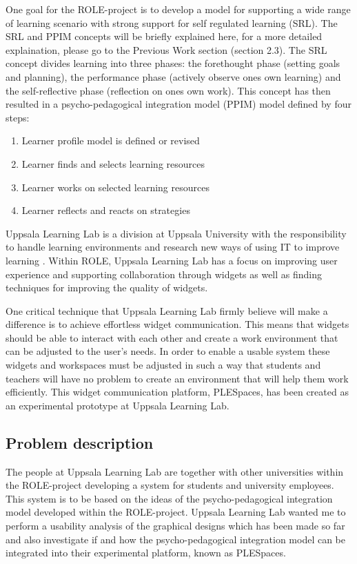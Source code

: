 One goal for the ROLE-project is to develop a model for supporting a wide range of learning scenario with strong support for self regulated learning (SRL). The SRL and PPIM concepts will be briefly explained here, for a more detailed explaination, please go to the Previous Work section (section 2.3). The SRL concept divides learning into three phases: the forethought phase (setting goals and planning), the performance phase (actively observe ones own learning) and the self-reflective phase (reflection on ones own work). This concept has then resulted in a  psycho-pedagogical integration model (PPIM) model defined by four steps: \cite{nussbaumer}
\begin {enumerate}
	\item Learner profile model is defined or revised
	\item Learner finds and selects learning resources
	\item Learner works on selected learning resources
	\item Learner reflects and reacts on strategies
\end {enumerate}

Uppsala Learning Lab is a division at Uppsala University with the responsibility to handle learning environments and research new ways of using IT to improve learning \cite{ull}. Within ROLE, Uppsala Learning Lab has a focus on improving user experience and supporting collaboration through widgets as well as finding techniques for improving the quality of widgets.

One critical technique that Uppsala Learning Lab firmly believe will make a difference is to achieve effortless widget communication. This means that widgets should be able to interact with each other and create a work environment that can be adjusted to the user's needs. In order to enable a usable system these widgets and workspaces must be adjusted in such a way that students and teachers will have no problem to create an environment that will help them work efficiently. This widget communication platform, PLESpaces, has been created as an experimental prototype at Uppsala Learning Lab.

\subsection {Problem description}
The people at Uppsala Learning Lab are together with other universities within the ROLE-project developing a system for students and university employees. This system is to be based on the ideas of the psycho-pedagogical integration model developed within the ROLE-project. Uppsala Learning Lab wanted me to perform a usability analysis of the graphical designs which has been made so far and also investigate if and how the psycho-pedagogical integration model can be integrated into their experimental platform, known as PLESpaces.

